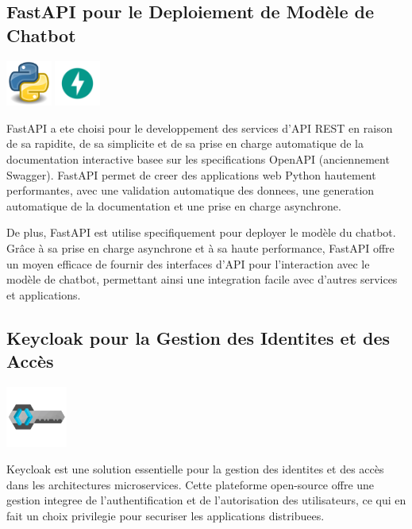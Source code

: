 \documentclass[a4paper, 11pt, openany]{report}
\begin{document}
\subsection{FastAPI pour le Deploiement de Modèle de Chatbot}
\begin{center}
\includegraphics[height=1.5cm]{python.png}
\includegraphics[height=1.5cm]{fastapi.png}
\end{center}

FastAPI a ete choisi pour le developpement des services d'API REST en raison de sa rapidite, de sa simplicite et de sa prise en charge automatique de la documentation interactive basee sur les specifications OpenAPI (anciennement Swagger). FastAPI permet de creer des applications web Python hautement performantes, avec une validation automatique des donnees, une generation automatique de la documentation et une prise en charge asynchrone.


De plus, FastAPI est utilise specifiquement pour deployer le modèle du chatbot. Grâce à sa prise en charge asynchrone et à sa haute performance, FastAPI offre un moyen efficace de fournir des interfaces d'API pour l'interaction avec le modèle de chatbot, permettant ainsi une integration facile avec d'autres services et applications.






\subsection{Keycloak pour la Gestion des Identites et des Accès}
\begin{center}
\includegraphics[height=2cm]{images/keycloak.png}
\end{center}

Keycloak est une solution essentielle pour la gestion des identites et des accès dans les architectures microservices. Cette plateforme open-source offre une gestion integree de l'authentification et de l'autorisation des utilisateurs, ce qui en fait un choix privilegie pour securiser les applications distribuees.
\end{document}
